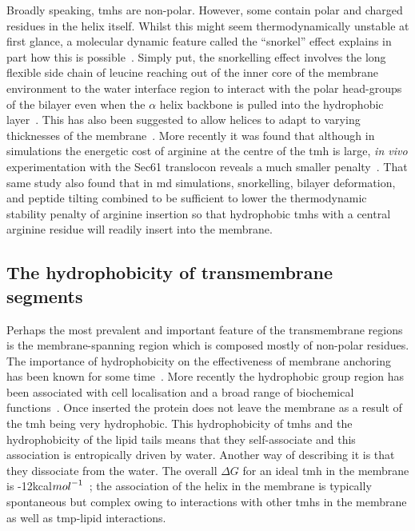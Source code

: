 Broadly speaking, \gls{tmh}s are non-polar.
However, some contain polar and charged residues in the helix itself.
Whilst this might seem thermodynamically unstable at first glance, a molecular dynamic feature called the ``snorkel'' effect explains in part how this is possible~\cite{Chamberlain2004, Strandberg2003}.
Simply put, the snorkelling effect involves the long flexible side chain of leucine reaching out of the inner core of the membrane environment to the water interface region to interact with the polar head-groups of the bilayer even when the $\alpha$ helix backbone is pulled into the hydrophobic layer~\cite{Krishnakumar2007}.
This has also been suggested to allow helices to adapt to varying thicknesses of the membrane~\cite{Kandasamy2006}.
More recently it was found that although in simulations the energetic cost of arginine at the centre of the \gls{tmh} is large, \textit{in vivo} experimentation with the Sec61 translocon reveals a much smaller penalty~\cite{Ulmschneider2017}.
That same study also found that in \gls{md} simulations, snorkelling, bilayer deformation, and peptide tilting combined to be sufficient to lower the thermodynamic stability penalty of arginine insertion so that hydrophobic \gls{tmh}s with a central arginine residue will readily insert into the membrane.


\subsection{The hydrophobicity of transmembrane segments}\label{section:hydrophobicityscales}

Perhaps the most prevalent and important feature of the transmembrane regions is the membrane\--spanning region which is composed mostly of non-polar residues.
The importance of hydrophobicity on the effectiveness of membrane anchoring has been known for some time~\cite{Davis1985}.
More recently the hydrophobic group region has been associated with cell localisation and a broad range of biochemical functions~\cite{Junne2010, Sharpe2010, Wong2012}.
Once inserted the protein does not leave the membrane as a result of the \gls{tmh} being very hydrophobic.
This hydrophobicity of \gls{tmh}s and the hydrophobicity of the lipid tails means that they self\--associate and this association is entropically driven by water.
Another way of describing it is that they dissociate from the water.
The overall $\Delta G$ for an ideal \gls{tmh} in the membrane is -12kcal${mol}^{\--1}$~\cite{Cymer2015}; the association of the helix in the membrane is typically spontaneous but complex owing to interactions with other \gls{tmh}s in the membrane as well as \gls{tmp}\--lipid interactions.

